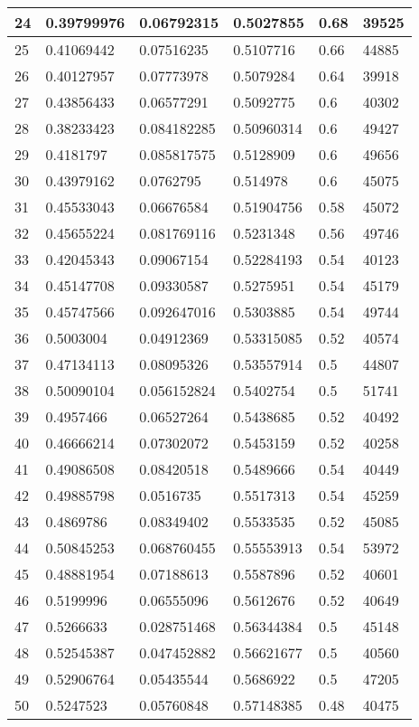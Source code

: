 \begin{longtable}{|l|l|l|l|l|l|}
24 & 0.39799976 & 0.06792315 & 0.5027855 & 0.68 & 39525 \\ \hline 
25 & 0.41069442 & 0.07516235 & 0.5107716 & 0.66 & 44885 \\ \hline 
26 & 0.40127957 & 0.07773978 & 0.5079284 & 0.64 & 39918 \\ \hline 
27 & 0.43856433 & 0.06577291 & 0.5092775 & 0.6 & 40302 \\ \hline 
28 & 0.38233423 & 0.084182285 & 0.50960314 & 0.6 & 49427 \\ \hline 
29 & 0.4181797 & 0.085817575 & 0.5128909 & 0.6 & 49656 \\ \hline 
30 & 0.43979162 & 0.0762795 & 0.514978 & 0.6 & 45075 \\ \hline 
31 & 0.45533043 & 0.06676584 & 0.51904756 & 0.58 & 45072 \\ \hline 
32 & 0.45655224 & 0.081769116 & 0.5231348 & 0.56 & 49746 \\ \hline 
33 & 0.42045343 & 0.09067154 & 0.52284193 & 0.54 & 40123 \\ \hline 
34 & 0.45147708 & 0.09330587 & 0.5275951 & 0.54 & 45179 \\ \hline 
35 & 0.45747566 & 0.092647016 & 0.5303885 & 0.54 & 49744 \\ \hline 
36 & 0.5003004 & 0.04912369 & 0.53315085 & 0.52 & 40574 \\ \hline 
37 & 0.47134113 & 0.08095326 & 0.53557914 & 0.5 & 44807 \\ \hline 
38 & 0.50090104 & 0.056152824 & 0.5402754 & 0.5 & 51741 \\ \hline 
39 & 0.4957466 & 0.06527264 & 0.5438685 & 0.52 & 40492 \\ \hline 
40 & 0.46666214 & 0.07302072 & 0.5453159 & 0.52 & 40258 \\ \hline 
41 & 0.49086508 & 0.08420518 & 0.5489666 & 0.54 & 40449 \\ \hline 
42 & 0.49885798 & 0.0516735 & 0.5517313 & 0.54 & 45259 \\ \hline 
43 & 0.4869786 & 0.08349402 & 0.5533535 & 0.52 & 45085 \\ \hline 
44 & 0.50845253 & 0.068760455 & 0.55553913 & 0.54 & 53972 \\ \hline 
45 & 0.48881954 & 0.07188613 & 0.5587896 & 0.52 & 40601 \\ \hline 
46 & 0.5199996 & 0.06555096 & 0.5612676 & 0.52 & 40649 \\ \hline 
47 & 0.5266633 & 0.028751468 & 0.56344384 & 0.5 & 45148 \\ \hline 
48 & 0.52545387 & 0.047452882 & 0.56621677 & 0.5 & 40560 \\ \hline 
49 & 0.52906764 & 0.05435544 & 0.5686922 & 0.5 & 47205 \\ \hline 
50 & 0.5247523 & 0.05760848 & 0.57148385 & 0.48 & 40475 \\ \hline 
\end{longtable}